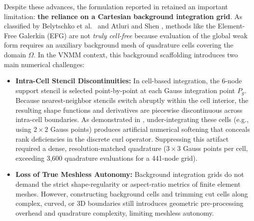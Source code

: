 \documentclass[VANCOUVER]{USG}
\begin{document}
Despite these advances, the formulation reported in \cite{stable_vnmm2d_2026} retained an important limitation: \textbf{the reliance on a Cartesian background integration grid}. As classified by Belytschko et al.~\cite{belytschko1994element} and Atluri and Shen \cite{atluri2002meshless}, methods like the Element-Free Galerkin (EFG) are not \textit{truly cell-free} because evaluation of the global weak form requires an auxiliary background mesh of quadrature cells covering the domain $\Omega$. In the VNMM context, this background scaffolding introduces two main numerical challenges:
\begin{itemize}
    \item \textbf{Intra-Cell Stencil Discontinuities:} In cell-based integration, the 6-node support stencil is selected point-by-point at each Gauss integration point $P_g$. Because nearest-neighbor stencils switch abruptly within the cell interior, the resulting shape functions and derivatives are piecewise discontinuous across intra-cell boundaries. As demonstrated in \cite{stable_vnmm2d_2026}, under-integrating these cells (e.g., using $2 \times 2$ Gauss points) produces artificial numerical softening that conceals rank deficiencies in the discrete curl operator. Suppressing this artifact required a dense, resolution-matched quadrature ($3 \times 3$ Gauss points per cell, exceeding 3,600 quadrature evaluations for a 441-node grid).
    \item \textbf{Loss of True Meshless Autonomy:} Background integration grids do not demand the strict shape-regularity or aspect-ratio metrics of finite element meshes. However, constructing background cells and trimming cut cells along complex, curved, or 3D boundaries still introduces geometric pre-processing overhead and quadrature complexity, limiting meshless autonomy.
\end{itemize}
\end{document}
